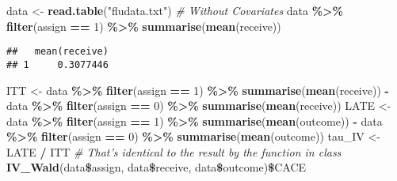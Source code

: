 \documentclass[]{article}
\newenvironment{Shaded}{\begin{snugshade}}{\end{snugshade}}
\newcommand{\KeywordTok}[1]{\textcolor[rgb]{0.13,0.29,0.53}{\textbf{#1}}}
\newcommand{\DecValTok}[1]{\textcolor[rgb]{0.00,0.00,0.81}{#1}}
\newcommand{\StringTok}[1]{\textcolor[rgb]{0.31,0.60,0.02}{#1}}
\newcommand{\CommentTok}[1]{\textcolor[rgb]{0.56,0.35,0.01}{\textit{#1}}}
\newcommand{\OperatorTok}[1]{\textcolor[rgb]{0.81,0.36,0.00}{\textbf{#1}}}
\newcommand{\NormalTok}[1]{#1}
\begin{document}
\begin{Shaded}
\begin{Highlighting}[]
\NormalTok{data <-}\StringTok{ }\KeywordTok{read.table}\NormalTok{(}\StringTok{"fludata.txt"}\NormalTok{)}
\CommentTok{# Without Covariates}
\NormalTok{data }\OperatorTok{\%>\%}\StringTok{ }\KeywordTok{filter}\NormalTok{(assign }\OperatorTok{==}\StringTok{ }\DecValTok{1}\NormalTok{) }\OperatorTok{\%>\%}\StringTok{ }\KeywordTok{summarise}\NormalTok{(}\KeywordTok{mean}\NormalTok{(receive))}
\end{Highlighting}
\end{Shaded}

\begin{verbatim}
##   mean(receive)
## 1     0.3077446
\end{verbatim}

\begin{Shaded}
\begin{Highlighting}[]
\NormalTok{ITT <-}\StringTok{ }\NormalTok{data }\OperatorTok{\%>\%}\StringTok{ }\KeywordTok{filter}\NormalTok{(assign }\OperatorTok{==}\StringTok{ }\DecValTok{1}\NormalTok{) }\OperatorTok{\%>\%}\StringTok{ }\KeywordTok{summarise}\NormalTok{(}\KeywordTok{mean}\NormalTok{(receive)) }\OperatorTok{-}\StringTok{ }\NormalTok{data }\OperatorTok{\%>\%}\StringTok{ }\KeywordTok{filter}\NormalTok{(assign }\OperatorTok{==}\StringTok{ }\DecValTok{0}\NormalTok{) }\OperatorTok{\%>\%}\StringTok{ }\KeywordTok{summarise}\NormalTok{(}\KeywordTok{mean}\NormalTok{(receive))}
\NormalTok{LATE <-}\StringTok{ }\NormalTok{data }\OperatorTok{\%>\%}\StringTok{ }\KeywordTok{filter}\NormalTok{(assign }\OperatorTok{==}\StringTok{ }\DecValTok{1}\NormalTok{) }\OperatorTok{\%>\%}\StringTok{ }\KeywordTok{summarise}\NormalTok{(}\KeywordTok{mean}\NormalTok{(outcome)) }\OperatorTok{-}\StringTok{ }\NormalTok{data }\OperatorTok{\%>\%}\StringTok{ }\KeywordTok{filter}\NormalTok{(assign }\OperatorTok{==}\StringTok{ }\DecValTok{0}\NormalTok{) }\OperatorTok{\%>\%}\StringTok{ }\KeywordTok{summarise}\NormalTok{(}\KeywordTok{mean}\NormalTok{(outcome))}
\NormalTok{tau_IV <-}\StringTok{ }\NormalTok{LATE }\OperatorTok{/}\StringTok{ }\NormalTok{ITT}
\CommentTok{# That's identical to the result by the function in class}
\KeywordTok{IV_Wald}\NormalTok{(data}\OperatorTok{\$}\NormalTok{assign, data}\OperatorTok{\$}\NormalTok{receive, data}\OperatorTok{\$}\NormalTok{outcome)}\OperatorTok{\$}\NormalTok{CACE}
\end{Highlighting}
\end{Shaded}
\end{document}
